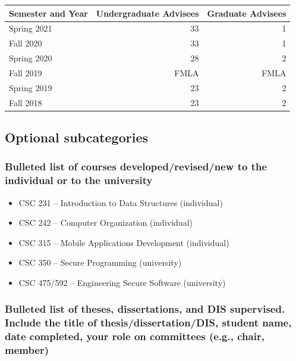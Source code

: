 \documentclass[10pt]{article}
\begin{document}
\begin{table}[!h]
\centering
\begin{tabular}{@{}lrr@{}}
\toprule
Semester and Year & Undergraduate   Advisees & Graduate Advisees   \\ \midrule
Spring 2021		  & 33						 & 1					\\
Fall 2020         & 33                       & 1                   \\
Spring 2020       & 28                       & 2                   \\
Fall 2019         & FMLA                     & FMLA                \\
Spring 2019       & 23                       & 2                   \\
Fall 2018         & 23                       & 2                   \\ \bottomrule
\end{tabular}
\end{table}


\subsection{Optional subcategories}

\subsubsection{Bulleted list of courses developed/revised/new to the individual or to the university}
\begin{itemize}
    \item CSC 231 – Introduction to Data Structures (individual)
    \item CSC 242 – Computer Organization (individual)
    \item CSC 315 – Mobile Applications Development (individual)
    \item CSC 350 – Secure Programming (university)
    \item CSC 475/592 – Engineering Secure Software (university)
\end{itemize}


\subsubsection{Bulleted list of theses, dissertations, and DIS supervised. Include the title of thesis/dissertation/DIS, student name, date completed, your role on committees (e.g., chair, member)}
\end{document}
